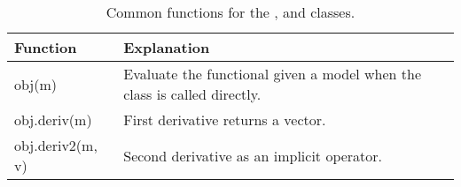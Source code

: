\begin{table}[ht]
\caption{Common functions for the \Regularization, and \DataMisfit classes.}
\label{table:Dmis_and_Reg}
  \begin{tabular}{  p{3.5cm}  p{10cm} }
    \hline

    Function & Explanation \\ \hline

    obj(m)  & Evaluate the functional given a model when the class is called directly.\\
    obj.deriv(m)     & First derivative returns a vector.\\
    obj.deriv2(m, v) & Second derivative as an implicit operator.\\

    \hline
  \end{tabular}
\end{table}
